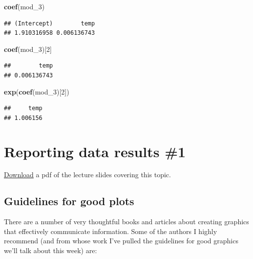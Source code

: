 \documentclass[]{book}
\makeatletter
\newenvironment{Shaded}{\begin{snugshade}}{\end{snugshade}}
\newcommand{\KeywordTok}[1]{\textcolor[rgb]{0.13,0.29,0.53}{\textbf{{#1}}}}
\newcommand{\DecValTok}[1]{\textcolor[rgb]{0.00,0.00,0.81}{{#1}}}
\newcommand{\NormalTok}[1]{{#1}}
\newenvironment{kframe}{%
\medskip{}
\setlength{\fboxsep}{.8em}
 \def\at@end@of@kframe{}%
 \ifinner\ifhmode%
  \def\at@end@of@kframe{\end{minipage}}%
  \begin{minipage}{\columnwidth}%
 \fi\fi%
 \def\FrameCommand##1{\hskip\@totalleftmargin \hskip-\fboxsep
 \colorbox{shadecolor}{##1}\hskip-\fboxsep
     \hskip-\linewidth \hskip-\@totalleftmargin \hskip\columnwidth}%
 \MakeFramed {\advance\hsize-\width
   \@totalleftmargin\z@ \linewidth\hsize
   \@setminipage}}%
 {\par\unskip\endMakeFramed%
 \at@end@of@kframe}
\renewenvironment{Shaded}{\begin{kframe}}{\end{kframe}}
\makeatother
\begin{document}
\begin{Shaded}
\begin{Highlighting}[]
\KeywordTok{coef}\NormalTok{(mod_3)}
\end{Highlighting}
\end{Shaded}

\begin{verbatim}
## (Intercept)        temp 
## 1.910316958 0.006136743
\end{verbatim}

\begin{Shaded}
\begin{Highlighting}[]
\KeywordTok{coef}\NormalTok{(mod_3)[}\DecValTok{2}\NormalTok{]}
\end{Highlighting}
\end{Shaded}

\begin{verbatim}
##        temp 
## 0.006136743
\end{verbatim}

\begin{Shaded}
\begin{Highlighting}[]
\KeywordTok{exp}\NormalTok{(}\KeywordTok{coef}\NormalTok{(mod_3)[}\DecValTok{2}\NormalTok{])}
\end{Highlighting}
\end{Shaded}

\begin{verbatim}
##     temp 
## 1.006156
\end{verbatim}

\chapter{Reporting data results \#1}\label{reporting-data-results-1}

\href{https://github.com/geanders/RProgrammingForResearch/raw/master/slides/CourseNotes_Week4.pdf}{Download}
a pdf of the lecture slides covering this topic.

\section{Guidelines for good plots}\label{guidelines-for-good-plots}

There are a number of very thoughtful books and articles about creating
graphics that effectively communicate information. Some of the authors I
highly recommend (and from whose work I've pulled the guidelines for
good graphics we'll talk about this week) are:
\end{document}
